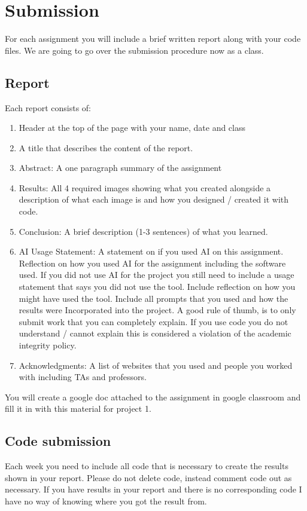 \documentclass[12pt]{article}
\begin{document}
\section{Submission}
For each assignment you will include a brief written report along with your code files.
We are going to go over the submission procedure now as a class. 

\subsection{Report}
Each report consists of:
\begin{enumerate}
\item Header at the top of the page with your name, date and class
\item A title that describes the content of the report. 
\item Abstract: A one paragraph summary of the assignment
\item Results: All 4 required images showing what you created alongside a description of what each image is and how you designed / created it with code.
\item Conclusion: A brief description (1-3 sentences) of what you learned.
\item AI Usage Statement: A statement on if you used AI on this assignment. Reflection on how you used AI for the assignment including the software used. If you did not use AI for the project you still need to include a usage statement that says you did not use the tool. Include reflection on how you might have used the tool. Include all prompts that you used and how the results were Incorporated into the project. A good rule of thumb, is to only submit work that you can completely explain. If you use code you do not understand / cannot explain this is considered a violation of the academic integrity policy.
\item Acknowledgments: A list of websites that you used and people you worked with including TAs and professors.
\end{enumerate}

You will create a google doc attached to the assignment in google classroom and fill it in with this material for project 1. 

\subsection{Code submission}
Each week you need to include all code that is necessary to create the results shown in your report.
Please do not delete code, instead comment code out as necessary.
If you have results in your report and there is no corresponding code I have no way of knowing where you got the result from.
\end{document}
